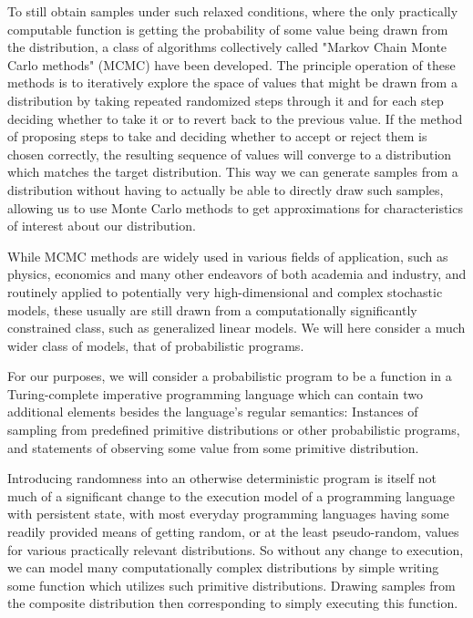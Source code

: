 To still obtain samples under such relaxed conditions, where the only practically computable function is getting the probability of some value being drawn from the distribution, a class of algorithms collectively called "Markov Chain Monte Carlo methods" (MCMC) have been developed. The principle operation of these methods is to iteratively explore the space of values that might be drawn from a distribution by taking repeated randomized steps through it and for each step deciding whether to take it or to revert back to the previous value. If the method of proposing steps to take and deciding whether to accept or reject them is chosen correctly, the resulting sequence of values will converge to a distribution which matches the target distribution. This way we can generate samples from a distribution without having to actually be able to directly draw such samples, allowing us to use Monte Carlo methods to get approximations for characteristics of interest about our distribution.

While MCMC methods are widely used in various fields of application, such as physics, economics and many other endeavors of both academia and industry, and routinely applied to potentially very high-dimensional and complex stochastic models, these usually are still drawn from a computationally significantly constrained class, such as generalized linear models. We will here consider a much wider class of models, that of probabilistic programs.

For our purposes, we will consider a probabilistic program to be a function in a Turing-complete imperative programming language which can contain two additional elements besides the language's regular semantics: Instances of sampling from predefined primitive distributions or other probabilistic programs, and statements of observing some value from some primitive distribution.

Introducing randomness into an otherwise deterministic program is itself not much of a significant change to the execution model of a programming language with persistent state, with most everyday programming languages having some readily provided means of getting random, or at the least pseudo-random, values for various practically relevant distributions. So without any change to execution, we can model many computationally complex distributions by simple writing some function which utilizes such primitive distributions. Drawing samples from the composite distribution then corresponding to simply executing this function.

